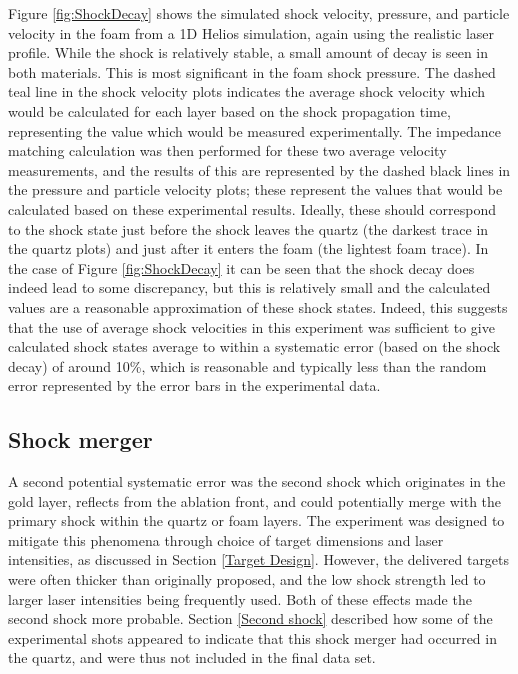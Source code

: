 Figure \ref{fig:ShockDecay} shows the simulated shock velocity, pressure, and particle velocity in the foam from a 1D Helios simulation, again using the realistic laser profile. While the shock is relatively stable, a small amount of decay is seen in both materials. This is most significant in the foam shock pressure. The dashed teal line in the shock velocity plots indicates the average shock velocity which would be calculated for each layer based on the shock propagation time, representing the value which would be measured experimentally. The impedance matching calculation was then performed for these two average velocity measurements, and the results of this are represented by the dashed black lines in the pressure and particle velocity plots; these represent the values that would be calculated based on these experimental results. Ideally, these should correspond to the shock state just before the shock leaves the quartz (the darkest trace in the quartz plots) and just after it enters the foam (the lightest foam trace). In the case of Figure \ref{fig:ShockDecay} it can be seen that the shock decay does indeed lead to some discrepancy, but this is relatively small and the calculated values are a reasonable approximation of these shock states. Indeed, this suggests that the use of average shock velocities in this experiment was sufficient to give calculated shock states average to within a systematic error (based on the shock decay) of around 10\%, which is reasonable and typically less than the random error represented by the error bars in the experimental data.

\subsection{Shock merger} \label{Shock merger}

A second potential systematic error was the second shock which originates in the gold layer, reflects from the ablation front, and could potentially merge with the primary shock within the quartz or foam layers. The experiment was designed to mitigate this phenomena through choice of target dimensions and laser intensities, as discussed in Section \ref{Target Design}. However, the delivered targets were often thicker than originally proposed, and the low shock strength led to larger laser intensities being frequently used. Both of these effects made the second shock more probable. Section \ref{Second shock} described how some of the experimental shots appeared to indicate that this shock merger had occurred in the quartz, and were thus not included in the final data set.

